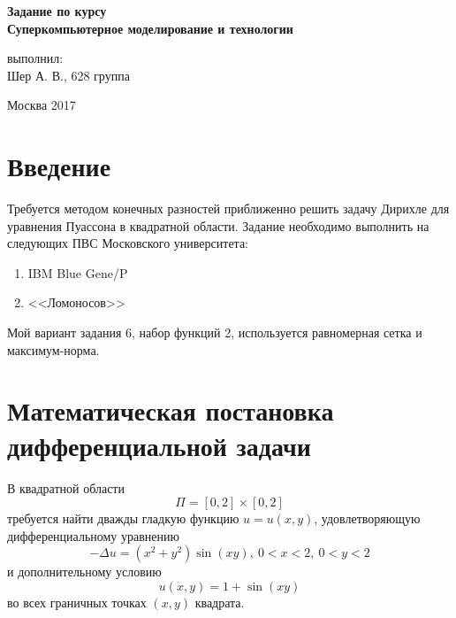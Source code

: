 \documentclass[12pt,notitlepage,oneside]{extarticle}
\begin{document}
\thispagestyle{empty}
  \begin{center}
  \large
   {\bfseries{Задание по курсу \\ Суперкомпьютерное моделирование и технологии }}
 \end{center}

\par

\par
\large
 \noindent


\par

\par
 \noindent

\vskip 6cm
   \begin{flushright}
   выполнил: \\
   Шер А. В., 628 группа
  \end{flushright}

\begin{center}
  \large  Москва 2017
\end{center}
\newpage

\tableofcontents
\newpage

\section{Введение}
Требуется методом конечных разностей приближенно решить задачу Дирихле для
уравнения Пуассона в квадратной области. Задание необходимо выполнить на
следующих ПВС Московского университета:
\begin{enumerate}
\item IBM Blue Gene/P
\item <<Ломоносов>>
\end{enumerate}

Мой вариант задания 6, набор функций 2, используется равномерная сетка и
максимум-норма.

\section{Математическая постановка дифференциальной задачи}
В квадратной области
\[
  \Pi = [0, 2] \times [0, 2]
\]
требуется найти дважды гладкую функцию $u = u(x, y)$, удовлетворяющую
дифференциальному уравнению
\[
  -\Delta u = (x^2 + y^2) \sin(xy),\  0 < x < 2,\  0 < y < 2
\]
и дополнительному условию
\[
  u(x, y) = 1 + \sin(xy)
\]
во всех граничных точках $(x, y)$ квадрата.
\end{document}

